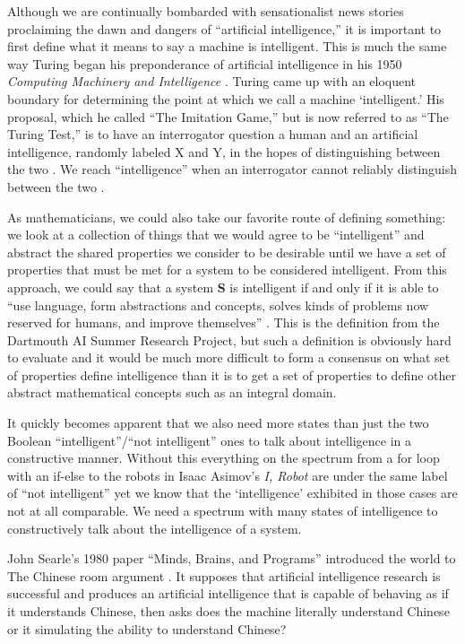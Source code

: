 \documentclass[oneside,12pt,openany]{book}
\begin{document}
	Although we are continually bombarded with sensationalist news stories proclaiming the dawn and dangers of ``artificial intelligence,'' it is important to first define what it means to say a machine is intelligent. This is much the same way Turing began his preponderance of artificial intelligence in his 1950 \textit{Computing Machinery and Intelligence} \cite{Turing}. Turing came up with an eloquent boundary for determining the point at which we call a machine `intelligent.' His proposal, which he called ``The Imitation Game,'' but is now referred to as ``The Turing Test,'' is to have an interrogator question a human and an artificial intelligence, randomly labeled X and Y, in the hopes of distinguishing between the two \cite{Turing}. We reach ``intelligence'' when an interrogator cannot reliably distinguish between the two \cite{Turing}.
	
	As mathematicians, we could also take our favorite route of defining something: we look at a collection of things that we would agree to be ``intelligent'' and abstract the shared properties we consider to be desirable until we have a set of properties that must be met for a system to be considered intelligent. From this approach, we could say that a system \textbf{S} is intelligent if and only if it is able to ``use language, form abstractions and concepts, solves kinds of problems now reserved for humans, and improve themselves'' \cite{Jones}. This is the definition from the Dartmouth AI Summer Research Project, but such a definition is obviously hard to evaluate and it would be much more difficult to form a consensus on what set of properties define intelligence than it is to get a set of properties to define other abstract mathematical concepts such as an integral domain.
	
	It quickly becomes apparent that we also need more states than just the two Boolean ``intelligent''/``not intelligent'' ones to talk about intelligence in a constructive manner. Without this everything on the spectrum from a for loop with an if-else to the robots in Isaac Asimov's \textit{I, Robot}  are under the same label of ``not intelligent'' yet we know that the `intelligence' exhibited in those cases are not at all comparable. We need a spectrum with many states of intelligence to constructively talk about the intelligence of a system.
	
	John Searle's 1980 paper ``Minds, Brains, and Programs'' introduced the world to The Chinese room argument \cite{Searle}. It supposes that artificial intelligence research is successful and produces an artificial intelligence that is capable of behaving as if it understands Chinese, then asks does the machine literally understand Chinese or it simulating the ability to understand Chinese? \cite{Searle} 
	
\end{document}

